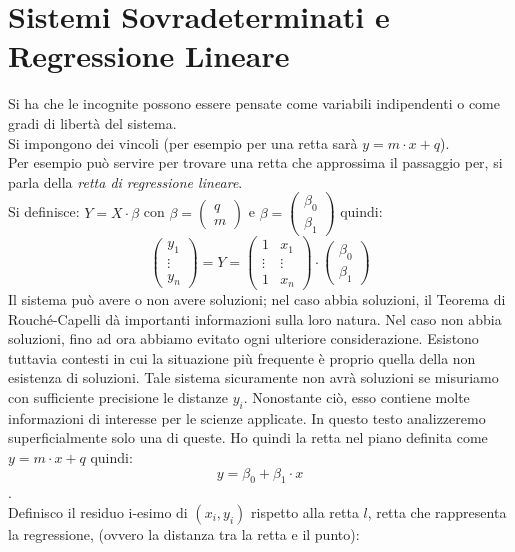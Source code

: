\documentclass[a4paper,12pt, oneside]{book}
\begin{document}
\chapter{Sistemi Sovradeterminati e Regressione Lineare}
Si ha che le incognite possono essere pensate come variabili indipendenti o come gradi di libertà del sistema.\\
Si impongono dei vincoli (per esempio per una retta sarà $y=m\cdot x+q$).\\
Per esempio può servire per trovare una retta che approssima il passaggio per, si parla della \textit{retta di regressione lineare}. \\
Si definisce: $Y=X\cdot \beta$ con $\beta=
	\left(\begin{matrix}
			q \\
			m
		\end{matrix}\right)
$ e $\beta=
	\left(\begin{matrix}
			\beta_0 \\
			\beta_1
		\end{matrix}\right)
$
quindi:
$$
	\left(\begin{matrix}
			y_1    \\
			\vdots \\
			y_n
		\end{matrix}\right)=Y=\left(\begin{matrix}
			1      & x_1    \\
			\vdots & \vdots \\
			1      & x_n
		\end{matrix}\right)\cdot\left(\begin{matrix}
			\beta_0 \\
			\beta_1
		\end{matrix}\right)
$$
Il sistema può avere o non avere soluzioni;  nel caso abbia soluzioni, il Teorema di Rouché-Capelli dà importanti informazioni sulla loro natura.  Nel caso non abbia soluzioni, fino ad ora
abbiamo evitato ogni ulteriore considerazione.  Esistono tuttavia contesti in cui la situazione
più frequente è proprio quella della non esistenza di soluzioni.
Tale sistema
sicuramente
non
avrà soluzioni se misuriamo con sufficiente precisione le distanze $y_i$.  Nonostante ciò, esso contiene molte informazioni di interesse per le scienze applicate.  In questo
testo analizzeremo superficialmente solo una di queste.
\newpage
Ho quindi la retta nel piano definita come $y=m\cdot x+q$ quindi: $$y=\beta_0+\beta_1\cdot x$$.\\
Definisco il residuo i-esimo di $(x_i, y_i)$ rispetto alla retta $l$, retta che rappresenta la regressione, (ovvero la distanza tra la retta e il punto):
\end{document}
